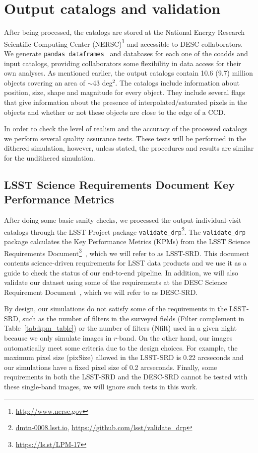 \documentclass[twocolumn]{aastex62}
\begin{document}
\section{Output catalogs and validation}
\label{sec:catalogs}
After being processed, the catalogs are stored at the National Energy Research Scientific Computing Center (NERSC)\footnote{\url{http://www.nersc.gov}} and accessible to DESC collaborators. We generate \texttt{pandas
dataframes}~\citep{mckinney-proc-scipy-2010} and databases for each one of the coadds and input catalogs, providing collaborators some flexibility in data access for their own analyses. As mentioned earlier, the output catalogs contain 10.6 (9.7) million objects covering an area
of $\sim$43 deg$^{2}$. The catalogs include information about position, size, shape and magnitude for every object. They include several flags that give information about the presence of interpolated/saturated pixels in the objects and whether or not these objects are close to the edge of a CCD.

In order to check the level of realism and the accuracy of the processed catalogs we perform several quality assurance tests. These tests will be performed in the dithered simulation, however, unless stated, the procedures and results are similar for the undithered simulation.

\subsection{LSST Science Requirements Document Key Performance Metrics}

After doing some basic sanity checks, we processed the output individual-visit catalogs through the LSST Project package \texttt{validate\_drp}\footnote{\url{dmtn-0008.lsst.io}, \url{https://github.com/lsst/validate_drp}}.
The \texttt{validate\_drp} package calculates the Key Performance Metrics (KPMs) from the LSST Science Requirements Document\footnote{\url{https://ls.st/LPM-17}}~\citep{LPM-17}, which we will refer to as LSST-SRD. This document contents science-driven requirements for LSST data products and we use it as a guide to check the status of our end-to-end pipeline. In addition, we will also validate our dataset using some of the requirements at the DESC Science Requirement Document~\citep[][DESC-SRD;]{2018arXiv180901669T}, which we will refer to as DESC-SRD.
 
By design, our simulations do not satisfy some of the requirements in the LSST-SRD, such as the number of filters in the surveyed fields (Filter complement in Table~\ref{tab:kpm_table}) or the number of filters (Nfilt) used in a given night because we only simulate images in $r$-band. On the other hand, our images automatically meet some criteria due to the design choices. For example, the maximum pixel size (pixSize) allowed in the LSST-SRD is 0.22 arcseconds and our simulations have a fixed pixel size of 0.2 arcseconds. Finally, some requirements in both the LSST-SRD and the DESC-SRD cannot be tested with these single-band images, we will ignore such tests in this work.
\end{document}
